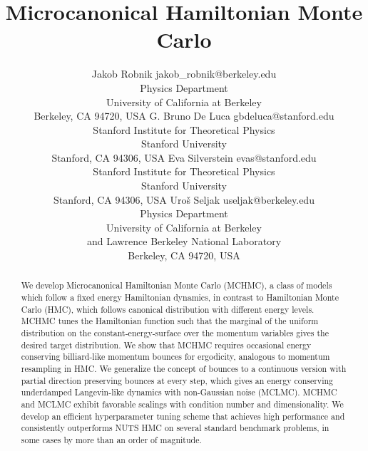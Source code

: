 \documentclass[twoside,11pt]{article}
\begin{document}
\title{Microcanonical Hamiltonian 
Monte Carlo}

\author{\name Jakob Robnik \email jakob\_robnik@berkeley.edu \\
      \addr Physics Department\\
      University of California at Berkeley\\
      Berkeley, CA 94720, USA
      \AND
      \name G. Bruno De Luca \email gbdeluca@stanford.edu \\
      \addr Stanford Institute for Theoretical Physics\\
      Stanford University\\
      Stanford, CA 94306, USA
      \AND
      \name Eva Silverstein \email evas@stanford.edu \\
      \addr Stanford Institute for Theoretical Physics\\
      Stanford University\\
      Stanford, CA 94306, USA
      \AND
      \name Uro\v{s} Seljak \email useljak@berkeley.edu \\
      \addr Physics Department\\
      University of California at Berkeley\\ and Lawrence Berkeley 
      National Laboratory\\
      Berkeley, CA 94720, USA}
       

\editor{}

\maketitle

\begin{abstract}%
We develop Microcanonical Hamiltonian Monte Carlo (MCHMC), a class of models which follow a fixed energy Hamiltonian dynamics, in contrast to Hamiltonian Monte Carlo (HMC), which follows canonical distribution with different energy levels. MCHMC tunes the Hamiltonian function such that the marginal of the uniform distribution on the constant-energy-surface over the momentum variables gives the desired target distribution. 
We show that MCHMC requires occasional energy conserving billiard-like momentum bounces for ergodicity, analogous to momentum resampling in HMC. We generalize the concept of bounces to a continuous version with partial direction preserving bounces at every step, which gives an energy conserving underdamped Langevin-like dynamics with non-Gaussian noise (MCLMC). 
MCHMC and MCLMC exhibit favorable scalings with condition number and dimensionality. We develop an efficient hyperparameter tuning scheme that achieves high performance and consistently outperforms NUTS HMC on several standard benchmark problems, in some cases by more than an order of magnitude. 
\end{abstract}
\end{document}
